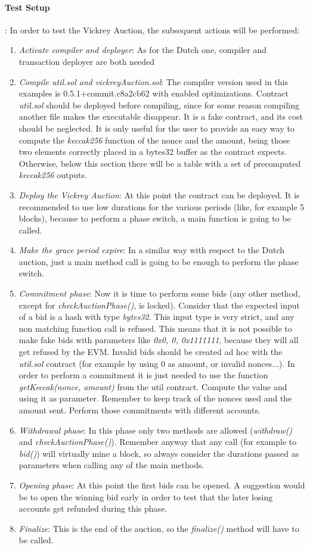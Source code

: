 \documentclass[11pt, a4paper]{report}
\begin{document}
	\paragraph*{Test Setup}: In order to test the Vickrey Auction, the subsequent actions will be performed:
	\begin{enumerate}
		\item \emph{Activate compiler and deployer}: As for the Dutch one, compiler and transaction deployer are both needed
		\item \emph{Compile util.sol and vickreyAuction.sol}: The compiler version used in this examples is 0.5.1+commit.c8a2cb62 with enabled optimizations. Contract \emph{util.sol} should be deployed before compiling, since for some reason compiling another file makes the executable disappear. It is a fake contract, and its cost should be neglected. It is only useful for the user to provide an easy way to compute the \emph{keccak256} function of the nonce and the amount, being those two elements correctly placed in a bytes32 buffer as the contract expects. Otherwise, below this section there will be a table with a set of precomputed \emph{keccak256} outputs.
		\item \emph{Deploy the Vickrey Auction}: At this point the contract can be deployed. It is recommended to use low durations for the various periods (like, for example 5 blocks), because to perform a phase switch, a main function is going to be called.
		\item \emph{Make the grace period expire}: In a similar way with respect to the Dutch auction, just a main method call is going to be enough to perform the phase switch.
		\item \emph{Commitment phase}: Now it is time to perform some bids (any other method, except for \emph{checkAuctionPhase()}, is locked). Consider that the expected input of a bid is a hash with type \emph{bytes32}. This input type is very strict, and any non matching function call is refused. This means that it is not possible to make fake bids with parameters like \emph{0x0, 0, 0x1111111}, because they will all get refused by the EVM. Invalid bids should be created ad hoc with the \emph{util.sol} contract (for example by using 0 as amount, or invalid nonces...).
		In order to perform a commitment it is just needed to use the function \emph{getKeccak(nonce, amount)} from the util contract. Compute the value and using it as parameter. Remember to keep track of the nonces used and the amount sent. Perform those commitments with different accounts.
		\item \emph{Withdrawal phase}: In this phase only two methods are allowed (\emph{withdraw()} and \emph{checkAuctionPhase()}). Remember anyway that any call (for example to \emph{bid()}) will virtually mine a block, so always consider the durations passed as parameters when calling any of the main methods.
		\item \emph{Opening phase}: At this point the first bids can be opened. A suggestion would be to open the winning bid early in order to test that the later losing accounts get refunded during this phase.
		\item \emph{Finalize}: This is the end of the auction, so the \emph{finalize()} method will have to be called.
	\end{enumerate}
\end{document}
